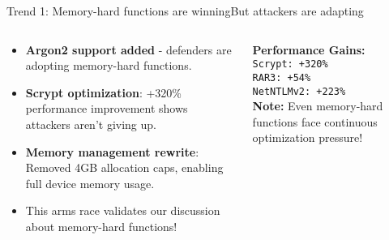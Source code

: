 \documentclass[aspectratio=169, lualatex, handout]{beamer}
\begin{document}
\begin{frame}{Trend 1: Memory-hard functions are winning}{But attackers are adapting}
	\begin{columns}[c]
		\begin{column}{0.55\textwidth}
			\begin{itemize}
				\item \textbf{Argon2 support added} - defenders are adopting memory-hard functions.
				\item \textbf{Scrypt optimization}: +320\% performance improvement shows attackers aren't giving up.
				\item \textbf{Memory management rewrite}: Removed 4GB allocation caps, enabling full device memory usage.
				\item This arms race validates our discussion about memory-hard functions!
			\end{itemize}
		\end{column}
		\begin{column}{0.45\textwidth}
			\begin{tcolorbox}[colback=black!5!white,colframe=ciphergray]
				\textbf{Performance Gains:}\\
				\texttt{Scrypt: +320\%}\\
				\texttt{RAR3: +54\%}\\
				\texttt{NetNTLMv2: +223\%}\\[0.5em]
				\textcolor{cipherprimary}{\textbf{Note:} \small Even memory-hard functions face continuous optimization pressure!}
			\end{tcolorbox}
		\end{column}
	\end{columns}
\end{frame}
\end{document}
